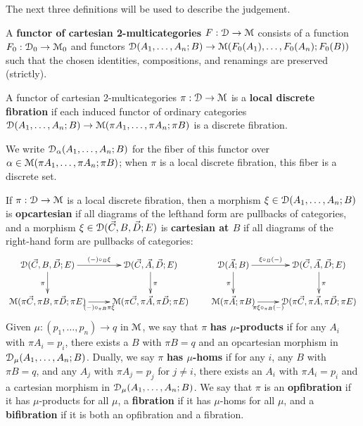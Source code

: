 The next three definitions will be used to describe the
 judgement.  

\begin{definition}
  A \textbf{functor of cartesian 2-multicategories} $F:\mathcal{D}\to\mathcal{M}$ consists
  of a function $F_0 : \mathcal{D}_0 \to \mathcal{M}_0$ and functors $\mathcal{D}(A_1,\ldots,A_n;B)
  \to \mathcal{M}(F_0(A_1),\ldots,F_0(A_n);F_0(B))$ such that the chosen
  identities, compositions, and renamings are preserved (strictly).
\end{definition}

\begin{definition}
  A functor of cartesian 2-multicategories $\pi:\mathcal{D}\to\mathcal{M}$ is a \textbf{local discrete fibration} if each induced functor of ordinary categories
  $\mathcal{D}(A_1,\dots,A_n;B)\to\mathcal{M}(\pi A_1,\dots,\pi A_n;\pi B)$
  is a discrete fibration.
\end{definition}

We write $\mathcal{D}_\alpha(A_1,\dots,A_n;B)$ for the fiber of this functor over
$\alpha \in \mathcal{M}(\pi A_1,\dots,\pi A_n;\pi B)$; when $\pi$ is a local discrete
fibration, this fiber is a discrete set.

\begin{definition}
  If $\pi:\mathcal{D}\to\mathcal{M}$ is a local discrete fibration, then a morphism
  $\xi\in\mathcal{D}(A_1,\dots,A_n;B)$ is \textbf{opcartesian} if all diagrams
  of the lefthand form are pullbacks of categories, and a morphism
  $\xi\in\mathcal{D}(\vec C,B,\vec D;E)$ is \textbf{cartesian at $B$} if all
  diagrams of the right-hand form are pullbacks of categories: 
  \[ \xymatrix{
    \cD(\vec C,B,\vec D;E) \ar[r]^-{(-)\circ_B \xi} \ar[d]_\pi &
    \cD(\vec C,\vec A,\vec D;E) \ar[d]^\pi \\
    \M(\pi\vec C,\pi B, \pi\vec D; \pi E) \ar[r]_-{(-)\circ_{\pi B} \pi\xi} &
    \M(\pi\vec C,\pi\vec A,\pi\vec D;\pi E)
  }
  \qquad
  \xymatrix{
    \cD(\vec A;B) \ar[r]^-{\xi\circ_B (-)} \ar[d]_\pi &
    \cD(\vec C,\vec A,\vec D;E) \ar[d]^\pi \\
    \M(\pi\vec A;\pi B) \ar[r]_-{\pi\xi\circ_{\pi B} (-)} &
    \cD(\pi\vec C,\pi\vec A,\pi\vec D;\pi E)}
  \]
  Given $\mu:(p_1,\dots,p_n) \to q$ in $\mathcal{M}$, we say that $\pi$ \textbf{has $\mu$-products} if for any $A_i$ with $\pi A_i = p_i$, there exists a $B$ with $\pi B = q$ and an opcartesian morphism in $\mathcal{D}_\mu(A_1,\dots,A_n;B)$.
  Dually, we say $\pi$ \textbf{has $\mu$-homs} if for any $i$, any $B$ with $\pi B = q$, and any $A_j$ with $\pi A_j = p_j$ for $j\neq i$, there exists an $A_i$ with $\pi A_i = p_i$ and a cartesian morphism in $\mathcal{D}_\mu(A_1,\dots,A_n;B)$.
  We say that $\pi$ is an \textbf{opfibration} if it has $\mu$-products for all $\mu$, a \textbf{fibration} if it has $\mu$-homs for all $\mu$, and a \textbf{bifibration} if it is both an opfibration and a fibration.
\end{definition}

